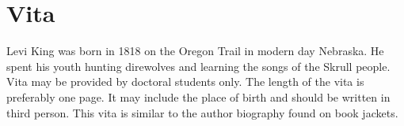 \chapter*{Vita}

\doublespacing
Levi King was born in 1818 on the Oregon Trail in modern day Nebraska. He spent his youth hunting direwolves and learning the songs of the Skrull people.
Vita may be provided by doctoral students only. The length of the vita is preferably one page. It may include the place of birth and should be written in third person. This vita is similar to the author biography found on book jackets.

